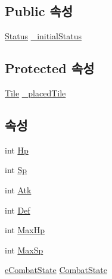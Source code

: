 \subsection*{Public 속성}
\begin{DoxyCompactItemize}
\item 
\hyperlink{struct_status}{Status} \hyperlink{class_combat_object_a8989ba48addd736a18b9e3074ffe5a5f}{\+\_\+initial\+Status}
\end{DoxyCompactItemize}
\subsection*{Protected 속성}
\begin{DoxyCompactItemize}
\item 
\hyperlink{class_tile}{Tile} \hyperlink{class_placeable_object_a0fd0566f0bb15c71b0630322762342d8}{\+\_\+placed\+Tile}
\end{DoxyCompactItemize}
\subsection*{속성}
\begin{DoxyCompactItemize}
\item 
int \hyperlink{class_combat_object_aa55597fe00c9fa9f3ff701313ffee7ae}{Hp}
\item 
int \hyperlink{class_combat_object_a042786e7e585cb8c00a3a85d3e89f861}{Sp}
\item 
int \hyperlink{class_combat_object_a96cb990e2f70cf963e6a1f8f4e992efa}{Atk}
\item 
int \hyperlink{class_combat_object_a9c4572f9571e28d069538807ddefc567}{Def}
\item 
int \hyperlink{class_combat_object_a7101559cd03a4e1d635425dc086f7da6}{Max\+Hp}
\item 
int \hyperlink{class_combat_object_aa515c86e379dd5300b036a662587b9d6}{Max\+Sp}
\item 
\hyperlink{_combat_object_8cs_ae6d9f4a8ae9fffcdf1a546168a44f917}{e\+Combat\+State} \hyperlink{class_combat_object_a25cac282f047475ab61d9f4b6187c9da}{Combat\+State}
\end{DoxyCompactItemize}

